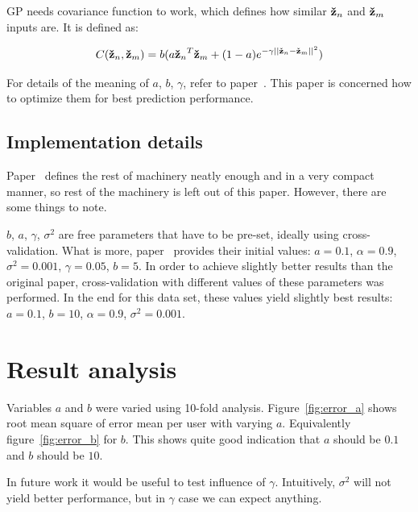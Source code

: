 \documentclass[english,11pt]{article}
\numberwithin{equation}{section}
\begin{document}
GP needs covariance function to work, which defines how similar $\zn$ and $\zm$
inputs are. It is defined as:

$$ C(\zn, \zm) = b(a \zn^T\zm +
(1 - a)e^{-\gamma || \zn - \zm ||^2 } )
$$

For details of the meaning of $a$, $b$, $\gamma$, refer to
paper~\cite{WeiRogMur}. This paper is concerned how to optimize them for best
prediction performance.

\subsection{Implementation details}

Paper~\cite{WeiRogMur} defines the rest of machinery neatly enough and in a very
compact manner, so rest of the machinery is left out of this paper. However,
there are some things to note.

$b$, $a$, $\gamma$, $\sigma^2$ are free parameters that have to be pre-set,
ideally using cross-validation. What is more, paper~\cite{WeiRogMur} provides
their initial values: $a = 0.1$, $\alpha = 0.9$, $\sigma^2 = 0.001$, $\gamma =
0.05$, $b = 5$. In order to achieve slightly better results than the original
paper, cross-validation with different values of these parameters was performed.
In the end for this data set, these values yield slightly best results: $a =
0.1$, $b = 10$, $\alpha = 0.9$, $\sigma^2 = 0.001$.

\section{Result analysis}

Variables $a$ and $b$ were varied using 10-fold analysis.
Figure~\ref{fig:error_a} shows root mean square of error mean per user with
varying $a$. Equivalently figure~\ref{fig:error_b} for $b$. This shows quite
good indication that $a$ should be $0.1$ and $b$ should be $10$.

In future work it would be useful to test influence of $\gamma$.  Intuitively,
$\sigma^2$ will not yield better performance, but in $\gamma$ case we can expect
anything.
\end{document}
